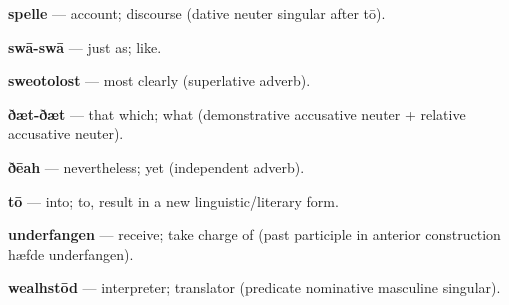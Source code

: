 \textbf{spelle} — account; discourse (dative neuter singular after tō).

\textbf{swā-swā} — just as; like.

\textbf{sweotolost} — most clearly (superlative adverb).

\textbf{ðæt-ðæt} — that which; what (demonstrative accusative neuter + relative accusative neuter).

\textbf{ðēah} — nevertheless; yet (independent adverb).

\textbf{tō} — into; to, result in a new linguistic/\allowbreak{}literary form.

\textbf{underfangen} — receive; take charge of (past participle in anterior construction hæfde underfangen).

\textbf{wealhstōd} — interpreter; translator (predicate nominative masculine singular).

